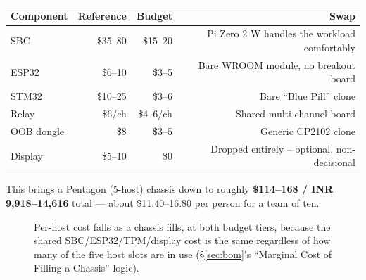 \documentclass[11pt,a4paper]{article}
\newcommand{\figcap}[1]{\caption{#1}}
\begin{document}
\begin{center}
\renewcommand{\arraystretch}{1.3}
\small
\begin{tabular}{@{}p{3.9cm}rrr@{}}
\toprule
\textbf{Component} & \textbf{Reference} & \textbf{Budget} & \textbf{Swap} \\
\midrule
SBC & \$35--80 & \$15--20 & Pi Zero 2 W handles the workload comfortably \\
ESP32 & \$6--10 & \$3--5 & Bare WROOM module, no breakout board \\
STM32 & \$10--25 & \$3--6 & Bare ``Blue Pill'' clone \\
Relay & \$6/ch & \$4--6/ch & Shared multi-channel board \\
OOB dongle & \$8 & \$3--5 & Generic CP2102 clone \\
Display & \$5--10 & \$0 & Dropped entirely -- optional, non-decisional \\
\bottomrule
\end{tabular}
\end{center}

This brings a Pentagon (5-host) chassis down to roughly
\textbf{\$114--168 / INR 9,918--14,616} total --- about \$11.40--16.80 per
person for a team of ten.

\begin{figure}[h!]
\centering
{}
\figcap{Per-host cost falls as a chassis fills, at both budget tiers, because the shared SBC/ESP32/TPM/display cost is the same regardless of how many of the five host slots are in use (\S\ref{sec:bom}'s ``Marginal Cost of Filling a Chassis'' logic).}
\label{fig:costchart}
\end{figure}
\end{document}
